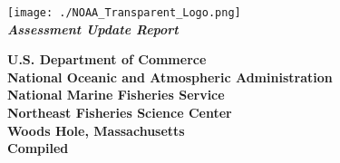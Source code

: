 \begin{titlingpage}
\begin{center}
\texttt{[image: ./NOAA\_Transparent\_Logo.png]}
\vfill
\huge{\textbf{\SPPnameT{}}} \\
\vfill
\huge{\textit{\textbf{ \RptYr{} Assessment Update Report}}}
\vspace*{\fill}

\large{\textbf{U.S. Department of Commerce\\
National Oceanic and Atmospheric Administration\\
National Marine Fisheries Service\\
Northeast Fisheries Science Center\\
Woods Hole, Massachusetts\\}
\vspace*{\fill}
\textbf{Compiled \monthname{}  \the\year{}}}
\end{center}
\end{titlingpage}
